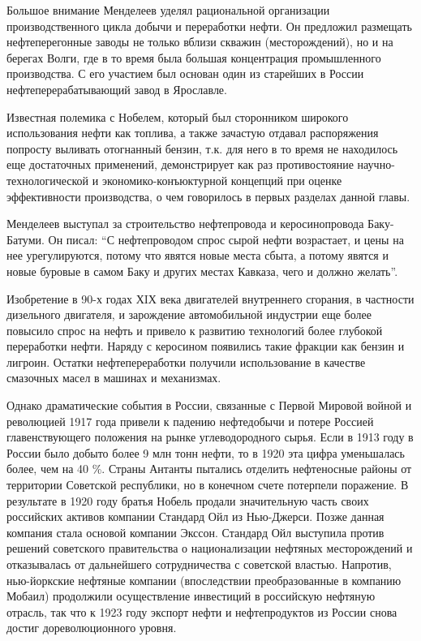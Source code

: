 Большое внимание Менделеев уделял рациональной организации производственного цикла добычи и переработки нефти.
Он предложил размещать нефтеперегонные заводы не только вблизи скважин (месторождений), но и на берегах Волги, где в то время была большая концентрация промышленного производства.
С его участием был основан один из старейших в России нефтеперерабатывающий завод в Ярославле.

Известная полемика с Нобелем, который был сторонником широкого использования нефти как топлива, а также зачастую отдавал распоряжения попросту выливать отогнанный бензин, т.к.
для него в то время не находилось еще достаточных применений, демонстрирует как раз противостояние научно-технологической и экономико-конъюктурной концепций при оценке эффективности производства, о чем говорилось в первых разделах данной главы.

Менделеев выступал за строительство нефтепровода и керосинопровода Баку-Батуми.
Он писал: ``С нефтепроводом спрос сырой нефти возрастает, и цены на нее урегулируются, потому что явятся новые места сбыта, а потому явятся и новые буровые в самом Баку и других местах Кавказа, чего и должно желать''.

Изобретение в 90-х годах ХIХ века двигателей внутреннего сгорания, в частности дизельного двигателя, и зарождение автомобильной индустрии еще более повысило спрос на нефть и привело к развитию технологий более глубокой переработки нефти.
Наряду с керосином появились такие фракции как бензин и лигроин.
Остатки нефтепереработки получили использование в качестве смазочных масел в машинах и механизмах.

Однако драматические события в России, связанные с Первой Мировой войной и революцией 1917 года привели к падению нефтедобычи и потере Россией главенствующего положения на рынке углеводородного сырья.
Если в 1913 году в России было добыто более 9 млн тонн нефти, то в 1920 эта цифра уменьшалась более, чем на 40 \%.
Страны Антанты пытались отделить нефтеносные районы от территории Советской республики, но в конечном счете потерпели поражение.
В результате в 1920 году братья Нобель продали значительную часть своих российских активов компании Стандард Ойл из Нью-Джерси.
Позже данная компания стала основой компании Экссон.
Стандард Ойл выступила против решений советского правительства о национализации нефтяных месторождений и отказывалась от дальнейшего сотрудничества с советской властью.
Напротив, нью-йоркские нефтяные компании (впоследствии преобразованные в компанию Мобаил) продолжили осуществление инвестиций в российскую нефтяную отрасль, так что к 1923 году экспорт нефти и нефтепродуктов из России снова достиг дореволюционного уровня.


